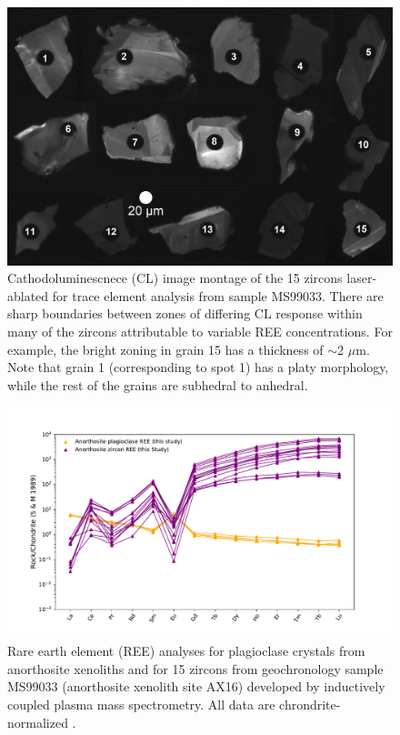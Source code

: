 \begin{figure}[h!]
\noindent\includegraphics[width=\textwidth]{figure/Zhang2021/CL_montage.png}
\centering
\caption[Cathodoluminescnece (CL) image montage of the 15 zircons laser-ablated for trace element analysis from sample MS99033.]{\footnotesize{Cathodoluminescnece (CL) image montage of the 15 zircons laser-ablated for trace element analysis from sample MS99033. There are sharp boundaries between zones of differing CL response within many of the zircons attributable to variable REE concentrations. For example, the bright zoning in grain 15 has a thickness of $\sim$2 $\mu$m. Note that grain 1 (corresponding to spot 1) has a platy morphology, while the rest of the grains are subhedral to anhedral.}}
\label{fig:CL_image}
\end{figure}

\begin{figure}[h!]
\noindent\includegraphics[width=\textwidth]{figure/Zhang2021/REE.pdf}
\centering
\caption[Rare earth element (REE) analyses for plagioclase crystals from anorthosite xenoliths and for 15 zircons from geochronology sample MS99033]{\footnotesize{Rare earth element (REE) analyses for plagioclase crystals from anorthosite xenoliths and for 15 zircons from geochronology sample MS99033 (anorthosite xenolith site AX16) developed by inductively coupled plasma mass spectrometry. All data are chrondrite-normalized \citep{Sun1989a}.}}
\label{fig:REE}
\end{figure}

